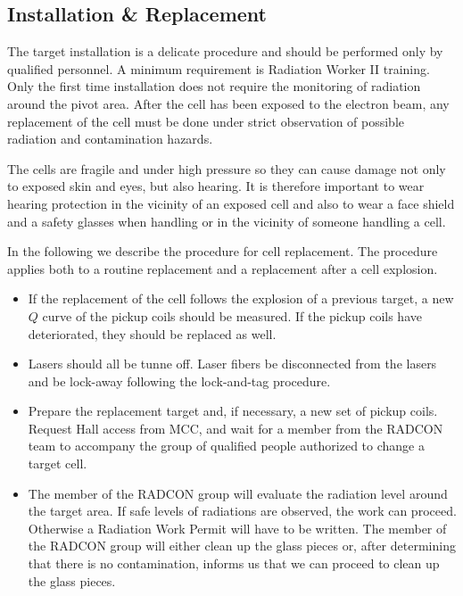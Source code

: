 {\subsection{Installation \& Replacement}

\begin{safetyen}{10}{5}
The target installation is a delicate procedure and should be
performed only by qualified personnel. A minimum requirement is
Radiation Worker II training.  Only the first time installation does
not require the monitoring of radiation around the pivot area. After
the cell has been exposed to the electron beam, any replacement of the
cell must be done under strict observation of possible radiation and
contamination hazards.

The cells are fragile and under high pressure so they can cause damage
not only to exposed skin and eyes, but also hearing.  It is therefore
important to wear hearing protection in the vicinity of an exposed
cell and also to wear a face shield and a safety glasses when handling
or in the vicinity of someone handling a cell.

\end{safetyen}

In the following we describe the procedure for cell replacement. The
procedure applies both to a routine replacement and a replacement
after a cell  explosion.

\begin{itemize}
\item 
If the replacement of the cell follows the explosion of a previous
target, a new $Q$ curve of the pickup coils should be measured. If the
pickup coils have deteriorated, they should be replaced as well.

\item
Lasers should all be tunne off. Laser fibers be disconnected from the lasers
and be lock-away following the lock-and-tag procedure.

\item 
Prepare the replacement target and, if necessary, a new set of
pickup coils. Request Hall access from MCC, and wait for a member from
the RADCON team to accompany the group of qualified people authorized
to change a target cell.

\item  
The member of the RADCON group will evaluate the radiation level
around the target area. If safe levels of radiations are observed, the
work can proceed. Otherwise a Radiation Work Permit will have to be
written. The member of the RADCON group will either clean up the 
glass pieces or, after determining that there is no contamination, informs 
us that we can proceed to clean up the glass pieces.


\end{itemize}}

